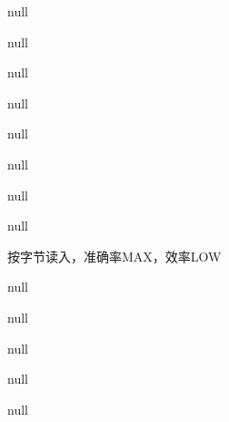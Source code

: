 
\begin{DoxyRefList}
\item[\label{todo__todo000025}%
\hypertarget{todo__todo000025}{}%
全局 \hyperlink{_get_opt_test_8c_a97dc5d244dcdb842fab654a276322639}{convert\-\_\-document} (void)]null  
\item[\label{todo__todo000001}%
\hypertarget{todo__todo000001}{}%
全局 \hyperlink{_double_link_8c_aec0d0b1312b68b305a5ec9cd4ae3c6c3}{Create\-List} ()]null 

null  
\item[\label{todo__todo000006}%
\hypertarget{todo__todo000006}{}%
全局 \hyperlink{_double_link_8c_aa397cd5b88823e339f63a646497bd260}{Delete\-List} (D\-L\-Node $\ast$\-List, void $\ast$data, int($\ast$\-Call\-Back\-Cmp)(const void $\ast$, const void $\ast$))]null 

null  
\item[\label{todo__todo000024}%
\hypertarget{todo__todo000024}{}%
全局 \hyperlink{_get_opt_test_8c_acf5088e61b616f77674f62a9ba3b86b7}{display\-\_\-usage} (void)]null  
\item[\label{todo__todo000008}%
\hypertarget{todo__todo000008}{}%
全局 \hyperlink{_double_link_8c_a15364937ad58d693d28671f21106d2ec}{Drop\-List} (D\-L\-Node $\ast$\-List)]null 

null  
\item[\label{todo__todo000022}%
\hypertarget{todo__todo000022}{}%
全局 \hyperlink{_get_opt_test_8c_ae823682b8b86c3bd035fdb849e4f3d1f}{Get\-File\-Content} (D\-L\-Node $\ast$\-List)]按字节读入，准确率\-M\-A\-X，效率\-L\-O\-W  
\item[\label{todo__todo000023}%
\hypertarget{todo__todo000023}{}%
全局 \hyperlink{_get_opt_test_8c_ab891633b1638654bdb2820c40f2cb6af}{Get\-Statistics} (int hflag, int sflag, int oflag)]null  
\item[\label{todo__todo000004}%
\hypertarget{todo__todo000004}{}%
全局 \hyperlink{_double_link_8c_a3c75e226a401f131a4808dd22b234cca}{Insert\-List} (D\-L\-Node $\ast$\-List, void $\ast$data)]null 

null  
\item[\label{todo__todo000026}%
\hypertarget{todo__todo000026}{}%
全局 \hyperlink{_get_opt_test_8c_a3c04138a5bfe5d72780bb7e82a18e627}{main} (int argc, char $\ast$$\ast$argv)]null  
\item[\label{todo__todo000002}%
\hypertarget{todo__todo000002}{}%
全局 \hyperlink{_double_link_8c_ae1482f414cdc6afe58c99a2615487057}{Search\-List} (D\-L\-Node $\ast$\-List, void $\ast$data, int($\ast$\-Call\-Back\-Cmp)(const void $\ast$, const void $\ast$))]null 


\end{DoxyRefList}
